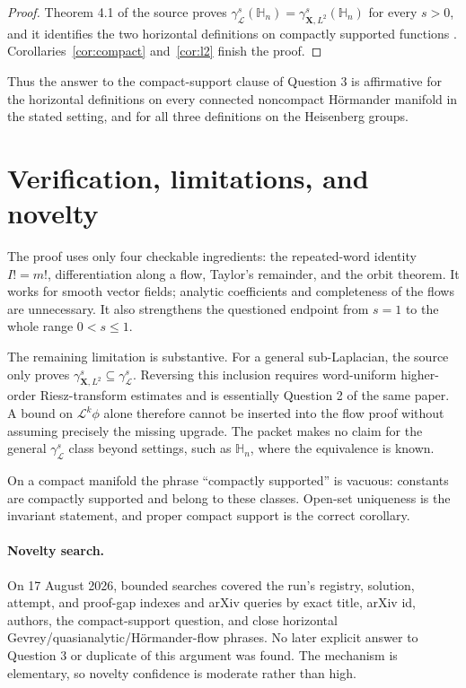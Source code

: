 \documentclass[11pt]{article}
\newcommand{\X}{\mathbf X}
\begin{document}
\begin{proof}
Theorem 4.1 of the source proves
\(\gamma^s_{\mathcal L}(\mathbb H_n)=
\gamma^s_{\X,L^2}(\mathbb H_n)\) for every \(s>0\), and it identifies the two
horizontal definitions on compactly supported functions \cite{source}.
Corollaries~\ref{cor:compact} and~\ref{cor:l2} finish the proof.
\end{proof}

Thus the answer to the compact-support clause of Question 3 is affirmative for
the horizontal definitions on every connected noncompact H\"ormander manifold
in the stated setting, and for all three definitions on the Heisenberg groups.

\section{Verification, limitations, and novelty}\label{sec:limits}

The proof uses only four checkable ingredients: the repeated-word identity
\(I!=m!\), differentiation along a flow, Taylor's remainder, and the orbit
theorem.  It works for smooth vector fields; analytic coefficients and
completeness of the flows are unnecessary.  It also strengthens the questioned
endpoint from \(s=1\) to the whole range \(0<s\le1\).

The remaining limitation is substantive.  For a general sub-Laplacian, the
source only proves
\(\gamma^s_{\X,L^2}\subseteq\gamma^s_{\mathcal L}\).  Reversing this inclusion
requires word-uniform higher-order Riesz-transform estimates and is essentially
Question 2 of the same paper.  A bound on \(\mathcal L^k\phi\) alone therefore
cannot be inserted into the flow proof without assuming precisely the missing
upgrade.  The packet makes no claim for the general
\(\gamma^s_{\mathcal L}\) class beyond settings, such as \(\mathbb H_n\), where
the equivalence is known.

On a compact manifold the phrase ``compactly supported'' is vacuous: constants
are compactly supported and belong to these classes.  Open-set uniqueness is
the invariant statement, and proper compact support is the correct corollary.

\paragraph{Novelty search.}
On 17 August 2026, bounded searches covered the run's registry, solution,
attempt, and proof-gap indexes and arXiv queries by exact title, arXiv id,
authors, the compact-support question, and close horizontal
Gevrey/quasianalytic/H\"ormander-flow phrases.  No later explicit answer to
Question 3 or duplicate of this argument was found.  The mechanism is
elementary, so novelty confidence is moderate rather than high.
\end{document}
